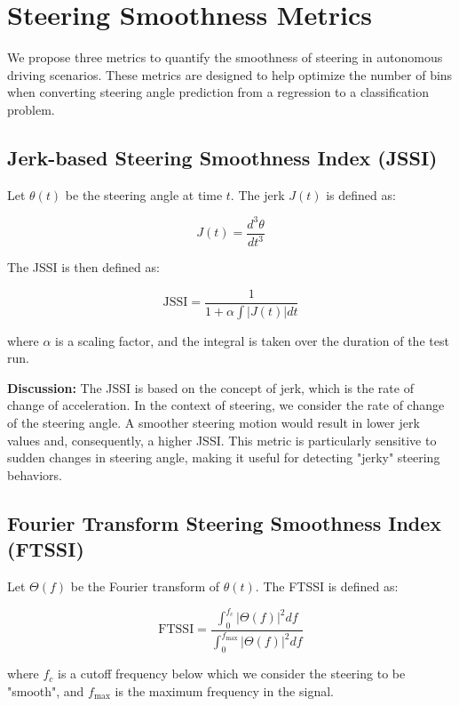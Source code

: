 
\section{Steering Smoothness Metrics}

We propose three metrics to quantify the smoothness of steering in autonomous driving scenarios. These metrics are designed to help optimize the number of bins when converting steering angle prediction from a regression to a classification problem.

\subsection{Jerk-based Steering Smoothness Index (JSSI)}

\begin{definition}
Let $\theta(t)$ be the steering angle at time $t$. The jerk $J(t)$ is defined as:

\[ J(t) = \frac{d^3\theta}{dt^3} \]

The JSSI is then defined as:

\[ \text{JSSI} = \frac{1}{1 + \alpha \int |J(t)| dt} \]

where $\alpha$ is a scaling factor, and the integral is taken over the duration of the test run.
\end{definition}

\textbf{Discussion:} The JSSI is based on the concept of jerk, which is the rate of change of acceleration. In the context of steering, we consider the rate of change of the steering angle. A smoother steering motion would result in lower jerk values and, consequently, a higher JSSI. This metric is particularly sensitive to sudden changes in steering angle, making it useful for detecting "jerky" steering behaviors.

\subsection{Fourier Transform Steering Smoothness Index (FTSSI)}

\begin{definition}
Let $\Theta(f)$ be the Fourier transform of $\theta(t)$. The FTSSI is defined as:

\[ \text{FTSSI} = \frac{\int_0^{f_c} |\Theta(f)|^2 df}{\int_0^{f_\text{max}} |\Theta(f)|^2 df} \]

where $f_c$ is a cutoff frequency below which we consider the steering to be "smooth", and $f_\text{max}$ is the maximum frequency in the signal.
\end{definition}

